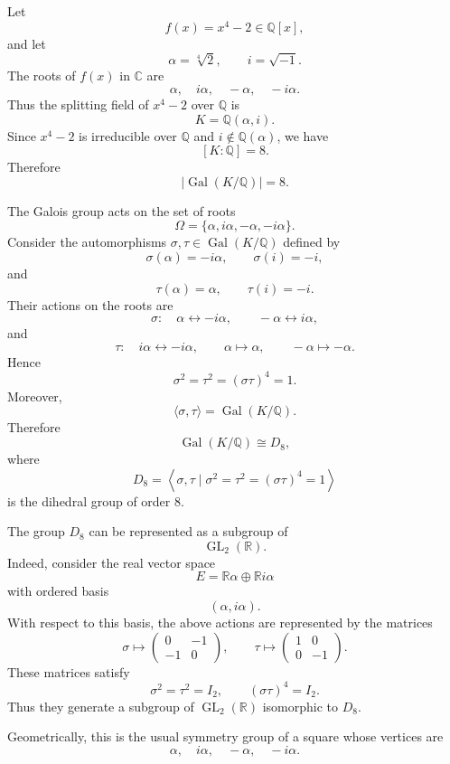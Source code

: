 \begin{example}
    Let
\[
    f(x)=x^4-2\in \mathbb{Q}[x],
\]
and let
\[
    \alpha=\sqrt[4]{2},\qquad i=\sqrt{-1}.
\]
The roots of \(f(x)\) in \(\mathbb{C}\) are
\[
    \alpha,\quad i\alpha,\quad -\alpha,\quad -i\alpha.
\]
Thus the splitting field of \(x^4-2\) over \(\mathbb{Q}\) is
\[
    K=\mathbb{Q}(\alpha,i).
\]
Since \(x^4-2\) is irreducible over \(\mathbb{Q}\) and \(i\notin \mathbb{Q}(\alpha)\), we have
\[
    [K:\mathbb{Q}]=8.
\]
Therefore
\[
    \left|\operatorname{Gal}(K/\mathbb{Q})\right|=8.
\]

The Galois group acts on the set of roots
\[
    \Omega=\{\alpha,i\alpha,-\alpha,-i\alpha\}.
\]
Consider the automorphisms \(\sigma,\tau\in \operatorname{Gal}(K/\mathbb{Q})\) defined by
\[
    \sigma(\alpha)=-i\alpha,\qquad \sigma(i)=-i,
\]
and
\[
    \tau(\alpha)=\alpha,\qquad \tau(i)=-i.
\]
Their actions on the roots are
\[
    \sigma:\quad
    \alpha\leftrightarrow -i\alpha,\qquad
    -\alpha\leftrightarrow i\alpha,
\]
and
\[
    \tau:\quad
    i\alpha\leftrightarrow -i\alpha,
    \qquad
    \alpha\mapsto \alpha,\qquad -\alpha\mapsto -\alpha.
\]
Hence
\[
    \sigma^2=\tau^2=(\sigma\tau)^4=1.
\]
Moreover,
\[
    \langle \sigma,\tau\rangle=\operatorname{Gal}(K/\mathbb{Q}).
\]
Therefore
\[
    \operatorname{Gal}(K/\mathbb{Q})
    \cong
    D_8,
\]
where
\[
    D_8
    =
    \left\langle \sigma,\tau
    \mid
    \sigma^2=\tau^2=(\sigma\tau)^4=1
    \right\rangle
\]
is the dihedral group of order \(8\).

The group \(D_8\) can be represented as a subgroup of
\[
    \operatorname{GL}_2(\mathbb{R}).
\]
Indeed, consider the real vector space
\[
    E=\mathbb{R}\alpha\oplus \mathbb{R}i\alpha
\]
with ordered basis
\[
    (\alpha,i\alpha).
\]
With respect to this basis, the above actions are represented by the matrices
\[
    \sigma\longmapsto
    \begin{pmatrix}
        0 & -1\\
        -1 & 0
    \end{pmatrix},
    \qquad
    \tau\longmapsto
    \begin{pmatrix}
        1 & 0\\
        0 & -1
    \end{pmatrix}.
\]
These matrices satisfy
\[
    \sigma^2=\tau^2=I_2,
    \qquad
    (\sigma\tau)^4=I_2.
\]
Thus they generate a subgroup of \(\operatorname{GL}_2(\mathbb{R})\) isomorphic to
\(D_8\).

Geometrically, this is the usual symmetry group of a square whose vertices are
\[
    \alpha,\quad i\alpha,\quad -\alpha,\quad -i\alpha.
\]
\end{example}
